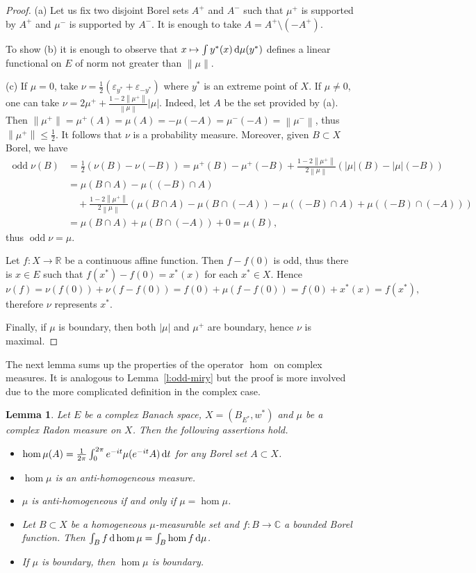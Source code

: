 \documentclass{amsart}
\numberwithin{equation}{section}
\newtheorem{lemma}[thm]{Lemma}
\theoremstyle{definition}
\def\ce{\mathbb C}
\def\ep{\varepsilon}
\def\er{\mathbb R}
\def\hom{\operatorname{hom}}
\def\odd{\operatorname{odd}}
\def\di{\,\mbox{\rm d}}
\newcommand{\norm}[1]{\left\|#1\right\|}
\newcommand{\abs}[1]{\left| #1  \right|}
\begin{document}
\begin{proof} (a) Let us fix two disjoint Borel sets $A^+$ and $A^-$ such that $\mu^+$ is supported by $A^+$ and $\mu^-$ is supported by $A^-$. It is enough to take $A=A^+\setminus(-A^+)$.

To show (b) it is enough to observe that $x\mapsto \int y^*(x)\di\mu(y^*)$ defines a linear functional on $E$ of norm not greater than $\|\mu\|$.

(c) If $\mu=0$, take $\nu=\frac12(\ep_{y^*}+\ep_{-y^*})$ where $y^*$ is an extreme point of $X$.
If $\mu\ne0$, one can take $\nu=2\mu^+ +\frac{1-2\norm{\mu^+}}{\norm{\mu}}\abs{\mu}$. Indeed, let $A$ be the set provided by (a). Then $\norm{\mu^+}=\mu^+(A)=\mu(A)=-\mu(-A)=\mu^-(-A)=\norm{\mu^-}$, thus $\norm{\mu^+}\le\frac12$. It follows that $\nu$ is a probability measure.
Moreover, given $B\subset X$ Borel, we have
$$\begin{aligned}
\odd\nu(B)&=\frac12(\nu(B)-\nu(-B))
=\mu^+(B)-\mu^+(-B)+\tfrac{1-2\norm{\mu^+}}{2\norm{\mu}} (\abs{\mu}(B)-\abs{\mu}(-B))
\\&=\mu(B\cap A)-\mu((-B)\cap A)\\&\quad+ \tfrac{1-2\norm{\mu^+}}{2\norm{\mu}} (\mu(B\cap A)-\mu(B\cap(-A))-\mu((-B)\cap A)+\mu((-B)\cap(-A)))
\\&=\mu(B\cap A)+\mu(B\cap(-A)) + 0 = \mu(B),\end{aligned}$$
thus $\odd\nu=\mu$.

Let $f:X\to\er$ be a continuous affine function. Then $f-f(0)$ is odd, thus there is $x\in E$ such that $f(x^*)-f(0)=x^*(x)$ for each $x^*\in X$. Hence
$$\nu(f)=\nu(f(0))+\nu(f-f(0))=f(0)+\mu(f-f(0))=f(0)+x^*(x)=f(x^*),$$
therefore $\nu$ represents $x^*$.

Finally, if $\mu$ is boundary, then both $|\mu|$ and $\mu^+$ are boundary, hence $\nu$ is maximal.
\end{proof}

The next lemma sums up the properties of the operator $\hom$ on complex measures. It is analogous to Lemma~\ref{l:odd-miry} but the proof is more involved due to the more complicated definition in the complex case.


\begin{lemma}\label{l:hom-miry1}
Let $E$ be a complex Banach space, $X=(B_{E^*},w^*)$ and $\mu$ be a complex Radon measure on $X$.
Then the following assertions hold.
\begin{itemize}
	\item[(a)] $\hom\mu(A)=\frac1{2\pi}\int_0^{2\pi}e^{-it}\mu(e^{-it}A)\di t$ for any  Borel set $A\subset X$.
	\item[(b)] $\hom\mu$ is an anti-homogeneous measure.
	\item[(c)] $\mu$ is anti-homogeneous if and only if $\mu=\hom\mu$.
	\item[(d)] Let $B\subset X$ be a homogeneous $\mu$-measurable set and $f:B\to \ce$ a bounded Borel function. Then $\int_B f\di\hom\mu=\int_B\hom f\di\mu$.
 \item[(e)] If $\mu$ is boundary, then $\hom\mu$ is boundary.
\end{itemize}
\end{lemma}
\end{document}

